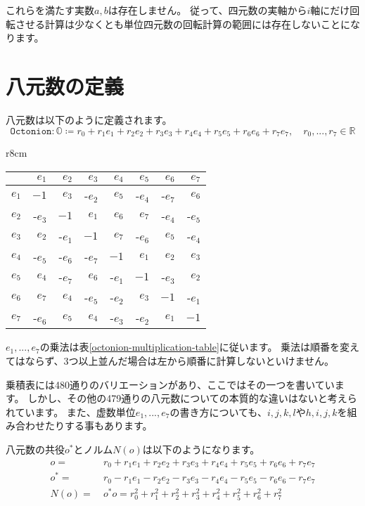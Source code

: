 \documentclass[a4paper,12pt,notitlepage]{jsreport}
\begin{document}
これらを満たす実数$a,b$は存在しません。
従って、四元数の実軸から$i$軸にだけ回転させる計算は少なくとも単位四元数の回転計算の範囲には存在しないことになります。

\section{八元数の定義}

八元数は以下のように定義されます。
\begin{equation}
  \texttt{Octonion}:\mathbb{O}\coloneq r_0+r_1e_1+r_2e_2+r_3e_3+r_4e_4+r_5e_5+r_6e_6+r_7e_7,
  \quad r_0,...,r_7\in\mathbb{R}
\end{equation}

\begin{wraptable}{r}{8cm}
  \caption{乗積表\label{octonion-multiplication-table}}
  \centering
  \begin{tabular}{rrrrrrrr}\hline
        & $e_1$& $e_2$& $e_3$& $e_4$& $e_5$& $e_6$& $e_7$\\\hline
    $e_1$& $ -1$& $e_3$&-$e_2$& $e_5$&-$e_4$&-$e_7$& $e_6$\\\hline
    $e_2$&-$e_3$& $ -1$& $e_1$& $e_6$& $e_7$&-$e_4$&-$e_5$\\\hline
    $e_3$& $e_2$&-$e_1$& $ -1$& $e_7$&-$e_6$& $e_5$&-$e_4$\\\hline
    $e_4$&-$e_5$&-$e_6$&-$e_7$& $ -1$& $e_1$& $e_2$& $e_3$\\\hline
    $e_5$& $e_4$&-$e_7$& $e_6$&-$e_1$& $ -1$&-$e_3$& $e_2$\\\hline
    $e_6$& $e_7$& $e_4$&-$e_5$&-$e_2$& $e_3$& $ -1$&-$e_1$\\\hline
    $e_7$&-$e_6$& $e_5$& $e_4$&-$e_3$&-$e_2$& $e_1$& $ -1$\\\hline
  \end{tabular}
\end{wraptable}

$e_1,...,e_7$の乗法は表\ref{octonion-multiplication-table}に従います。
乗法は順番を変えてはならず、3つ以上並んだ場合は左から順番に計算しないといけません。

乗積表には480通りのバリエーションがあり、ここではその一つを書いています。
しかし、その他の479通りの八元数についての本質的な違いはないと考えられています。
また、虚数単位$e_1,...,e_7$の書き方についても、$i,j,k,l$や$h,i,j,k$を組み合わせたりする事もあります。

八元数の共役$o^*$とノルム$N(o)$は以下のようになります。
\begin{equation}
  \begin{split}
    o=~&r_0+r_1e_1+r_2e_2+r_3e_3+r_4e_4+r_5e_5+r_6e_6+r_7e_7\\
    o^*=~&r_0-r_1e_1-r_2e_2-r_3e_3-r_4e_4-r_5e_5-r_6e_6-r_7e_7\\
    N(o)=~&o^*o=r_0^2+r_1^2+r_2^2+r_3^2+r_4^2+r_5^2+r_6^2+r_7^2
  \end{split}
\end{equation}
\end{document}
